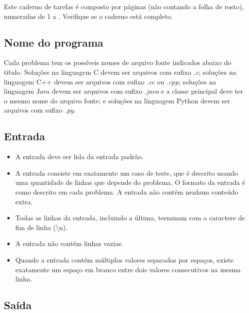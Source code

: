 

Este caderno de tarefas é composto por \pageref{lastpage} páginas (não
contando a folha de rosto), numeradas 
de 1 a \pageref{lastpage}. Verifique se o caderno está completo.

\subsection*{Nome do programa}
Cada problema tem os possíveis nomes de arquivo fonte indicados abaixo do
título.  Soluções na linguagem C devem ser arquivos com sufixo \emph{.c};
soluções na linguagem C++ devem ser arquivos com sufixo \emph{.cc} ou
\emph{.cpp}; soluções na linguagem Java devem ser arquivos com sufixo
\emph{.java} e a classe principal deve ter o mesmo nome do arquivo fonte; e
soluções na linguagem Python devem ser arquivos com sufixo \emph{.py}.

\subsection*{Entrada}

\begin{itemize}
\item A entrada deve ser lida da entrada padrão.

\item A entrada consiste em exatamente um caso de teste, que é descrito usando uma
quantidade de linhas que depende do problema. O formato da entrada é como descrito
em cada problema. A entrada não contém nenhum conteúdo extra.

\item Todas as linhas da entrada, incluindo a última, terminam com o caractere de fim
de linha (\textbackslash n).

\item A entrada não contém linhas vazias.

\item Quando a entrada contém múltiplos valores separados por espaços, 
existe exatamente um espaço em branco entre dois valores consecutivos na mesma linha.

\end{itemize}

\subsection*{Saída}


